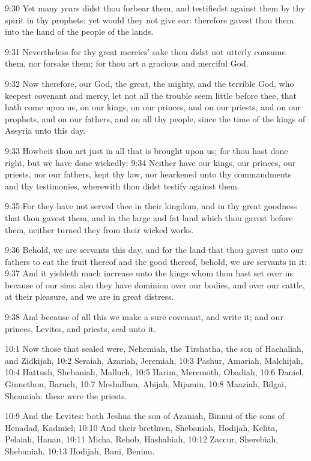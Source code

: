 9:30 Yet many years didst thou forbear them, and testifiedst against them by thy spirit in thy prophets: yet would they not give ear: therefore gavest thou them into the hand of the people of the lands.

9:31 Nevertheless for thy great mercies' sake thou didst not utterly consume them, nor forsake them; for thou art a gracious and merciful God.

9:32 Now therefore, our God, the great, the mighty, and the terrible God, who keepest covenant and mercy, let not all the trouble seem little before thee, that hath come upon us, on our kings, on our princes, and on our priests, and on our prophets, and on our fathers, and on all thy people, since the time of the kings of Assyria unto this day.

9:33 Howbeit thou art just in all that is brought upon us; for thou hast done right, but we have done wickedly: 9:34 Neither have our kings, our princes, our priests, nor our fathers, kept thy law, nor hearkened unto thy commandments and thy testimonies, wherewith thou didst testify against them.

9:35 For they have not served thee in their kingdom, and in thy great goodness that thou gavest them, and in the large and fat land which thou gavest before them, neither turned they from their wicked works.

9:36 Behold, we are servants this day, and for the land that thou gavest unto our fathers to eat the fruit thereof and the good thereof, behold, we are servants in it: 9:37 And it yieldeth much increase unto the kings whom thou hast set over us because of our sins: also they have dominion over our bodies, and over our cattle, at their pleasure, and we are in great distress.

9:38 And because of all this we make a sure covenant, and write it; and our princes, Levites, and priests, seal unto it.

10:1 Now those that sealed were, Nehemiah, the Tirshatha, the son of Hachaliah, and Zidkijah, 10:2 Seraiah, Azariah, Jeremiah, 10:3 Pashur, Amariah, Malchijah, 10:4 Hattush, Shebaniah, Malluch, 10:5 Harim, Meremoth, Obadiah, 10:6 Daniel, Ginnethon, Baruch, 10:7 Meshullam, Abijah, Mijamin, 10:8 Maaziah, Bilgai, Shemaiah: these were the priests.

10:9 And the Levites: both Jeshua the son of Azaniah, Binnui of the sons of Henadad, Kadmiel; 10:10 And their brethren, Shebaniah, Hodijah, Kelita, Pelaiah, Hanan, 10:11 Micha, Rehob, Hashabiah, 10:12 Zaccur, Sherebiah, Shebaniah, 10:13 Hodijah, Bani, Beninu.

